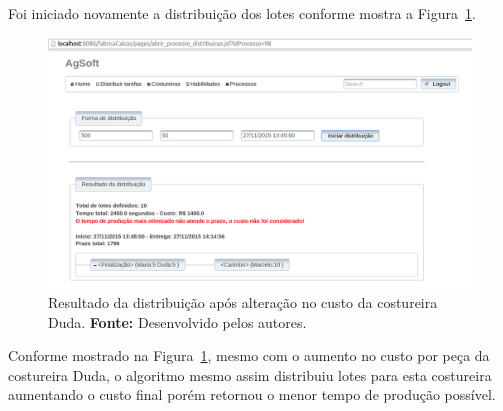 \par Foi iniciado novamente a distribuição dos lotes conforme mostra a Figura~\ref{fig:resultado2_teste6}.

\begin{figure}[h!]
	\centerline{\includegraphics[scale=0.3]{./imagens/resultado2_teste6.png}}
	\caption[Resultado da distribuição após alteração no custo da costureira Duda.] 
	{Resultado da distribuição após alteração no custo da costureira Duda. \textbf{Fonte:} Desenvolvido pelos
	autores.}
	\label{fig:resultado2_teste6}
\end{figure}

\par Conforme mostrado na Figura~\ref{fig:resultado2_teste6}, mesmo com o
aumento no custo por peça da costureira Duda, o algoritmo mesmo assim distribuiu
lotes para esta costureira aumentando o custo final porém retornou o
menor tempo de produção possível.
